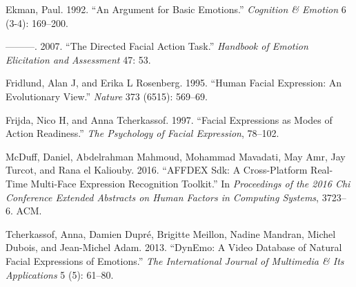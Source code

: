 \documentclass[conference,final,]{IEEEtran}
\begin{document}
\leavevmode\hypertarget{ref-ekman1992argument}{}%
Ekman, Paul. 1992. ``An Argument for Basic Emotions.'' \emph{Cognition
\& Emotion} 6 (3-4): 169--200.

\leavevmode\hypertarget{ref-ekman2007directed}{}%
---------. 2007. ``The Directed Facial Action Task.'' \emph{Handbook of
Emotion Elicitation and Assessment} 47: 53.

\leavevmode\hypertarget{ref-fridlund1995human}{}%
Fridlund, Alan J, and Erika L Rosenberg. 1995. ``Human Facial
Expression: An Evolutionary View.'' \emph{Nature} 373 (6515): 569--69.

\leavevmode\hypertarget{ref-frijda1997facial}{}%
Frijda, Nico H, and Anna Tcherkassof. 1997. ``Facial Expressions as
Modes of Action Readiness.'' \emph{The Psychology of Facial Expression},
78--102.

\leavevmode\hypertarget{ref-mcduff2016affdex}{}%
McDuff, Daniel, Abdelrahman Mahmoud, Mohammad Mavadati, May Amr, Jay
Turcot, and Rana el Kaliouby. 2016. ``AFFDEX Sdk: A Cross-Platform
Real-Time Multi-Face Expression Recognition Toolkit.'' In
\emph{Proceedings of the 2016 Chi Conference Extended Abstracts on Human
Factors in Computing Systems}, 3723--6. ACM.

\leavevmode\hypertarget{ref-tcherkassof2013dynemo}{}%
Tcherkassof, Anna, Damien Dupré, Brigitte Meillon, Nadine Mandran,
Michel Dubois, and Jean-Michel Adam. 2013. ``DynEmo: A Video Database of
Natural Facial Expressions of Emotions.'' \emph{The International
Journal of Multimedia \& Its Applications} 5 (5): 61--80.
\end{document}
